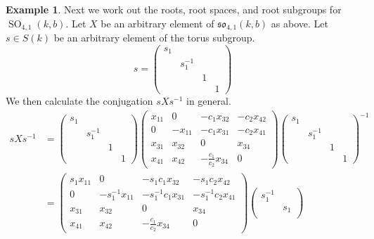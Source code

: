 \documentclass[12pt]{article}
\theoremstyle{definition}
\newtheorem{example}[theorem]{Example}
\numberwithin{theorem}{subsection}
\newcommand{\inv}{^{-1}}
\newcommand{\frakso}{\mathfrak{so}}
\DeclareMathOperator{\SO}{SO}
\begin{document}
\begin{example}
\label{roots for so41}
Next we work out the roots, root spaces, and root subgroups for $\SO_{4,1}(k,b)$. Let $X$ be an arbitrary element of $\frakso_{4,1}(k,b)$ as above. Let $s \in S(k)$ be an arbitrary element of the torus subgroup.
\[
	s =
	\begin{pmatrix}
		s_1 \\
		& s_1 \inv \\
		&& 1 \\
		&&& 1
	\end{pmatrix}
\]
We then calculate the conjugation $sXs \inv$ in general.
\begin{align*}
	sXs \inv &=
	\begin{pmatrix}
		s_1 \\
		& s_1 \inv \\
		&& 1 \\
		&&& 1
	\end{pmatrix}
	\begin{pmatrix}
		x_{11} & 0 & -c_1 x_{32}  & -c_2 x_{42} \\
		0 & -x_{11} & -c_1 x_{31} & -c_2 x_{41} \\
		x_{31} & x_{32} & 0 & x_{34} \\
		x_{41} & x_{42} & - \frac{c_1}{c_2} x_{34} & 0
	\end{pmatrix}
	\begin{pmatrix}
		s_1 \\
		& s_1 \inv \\
		&& 1 \\
		&&& 1
	\end{pmatrix}
	\inv\\
	&=
	\begin{pmatrix}
		s_1 x_{11} & 0 & - s_1 c_1 x_{32}  & - s_1 c_2 x_{42} \\
		0 & - s_1 \inv x_{11} & - s_1 \inv c_1 x_{31} & - s_1 \inv c_2 x_{41} \\
		x_{31} & x_{32} & 0 & x_{34} \\
		x_{41} & x_{42} & - \frac{c_1}{c_2} x_{34} & 0
	\end{pmatrix}
	\begin{pmatrix}
		s_1 \inv \\
		& s_1 \\

\end{pmatrix}
\end{align*}
\end{example}
\end{document}
